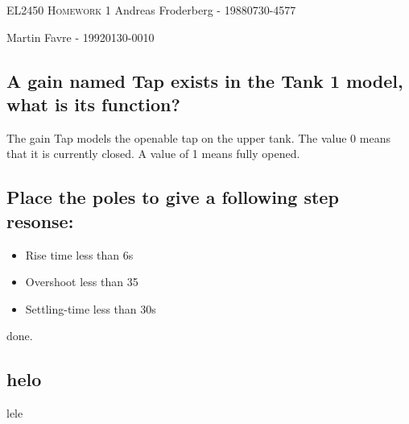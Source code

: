 \documentclass[10pt, a4paper]{article}
\begin{document}
\begin{titlepage}
\centering
{
 \scshape \LARGE 
EL2450 Homework 1
}
\vfill
Andreas Froderberg - 19880730-4577
\par
Martin Favre - 19920130-0010
\end{titlepage}


\subsection{A gain named Tap exists in the Tank 1 model, what is its function?}

The gain Tap models the openable tap on the upper tank. The value 0 means that it is currently closed. A value of 1 means fully opened.

\subsection{Place the poles to give a following step resonse:
}
\begin{itemize}
\item Rise time less than 6s
\item Overshoot less than 35
\item Settling-time less than 30s
\end{itemize}
done.
\subsection{ helo }
lele
\end{document}
